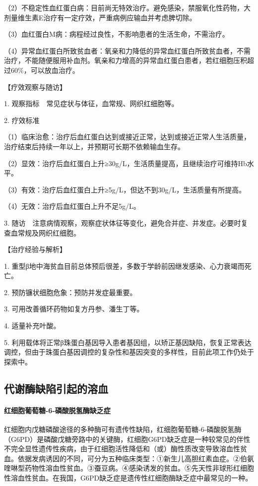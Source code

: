 （2）不稳定性血红蛋白病：目前尚无特效治疗。避免感染，禁服氧化性药物，大剂量维生素E治疗有一定疗效，严重病例应输血并考虑脾切除。

（3）血红蛋白M病：病程经过良性，不影响患者的生活生命，不需治疗。

（4）异常血红蛋白所致贫血者：氧亲和力降低的异常血红蛋白所致贫血者，不需治疗，不能随便服用补血剂。氧亲和力增高的异常血红蛋白患者，若红细胞压积超过60\%，可以放血治疗。

【疗效观察与随访】

1. 观察指标　常见症状与体征，血常规、网织红细胞等。

2. 疗效标准

（1）临床治愈：治疗后血红蛋白达到或接近正常，达到或接近正常人生活质量，治疗结束后持续一年以上，并预期可长期不依赖输血生存。

（2）显效：治疗后血红蛋白上升≥30g/L，生活质量提高，且继续治疗可维持Hb水平。

（3）有效：治疗后血红蛋白上升≥5g/L，但达不到30g/L，生活质量有所提高。

（4）无效：治疗后血红蛋白上升不足5g/L。

3.
随访　注意病情观察，观察症状体征等变化，避免合并症、并发症。必要时复查血常规及网织红细胞。

【治疗经验与解析】

1.
重型β地中海贫血目前总体预后很差，多数于学龄前因继发感染、心力衰竭而死亡。

2. 预防镰状细胞危象：预防并发症最重要。

3. 可用改善循环药物如复方丹参、潘生丁等。

4. 适量补充叶酸。

5.
利用载体将正常β珠蛋白基因导入患者基因组，以矫正基因缺陷，恢复正常表达调控，但由于珠蛋白基因调控的复杂性和基因突变的多样性，目前此项工作仍处于探索中。

\subsection{代谢酶缺陷引起的溶血}

\paragraph{红细胞葡萄糖-6-磷酸脱氢酶缺乏症}

红细胞内戊糖磷酸途径的多种酶可有遗传性缺陷，红细胞葡萄糖-6-磷酸脱氢酶（G6PD）是磷酸戊糖旁路中的关键酶，红细胞G6PD缺乏症是一种较常见的伴性不完全显性遗传性疾病，由于红细胞活性降低和（或）酶性质改变导致溶血性贫血。依据发病诱因的不同，可分为五种临床类型：①新生儿高胆红素血症。②伯氨喹啉型药物性溶血性贫血。③蚕豆病。④感染诱发的贫血。⑤先天性非球形红细胞性溶血性贫血。在我国，G6PD缺乏症是遗传性红细胞酶缺乏症中最常见的一种。

